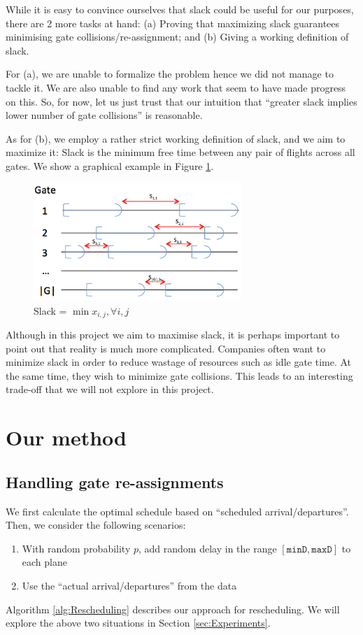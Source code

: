 \documentclass[12pt, a4paper]{report}
\begin{document}
While it is easy to convince ourselves that slack could be useful for our purposes, there are 2 more tasks at hand: (a) Proving that maximizing slack guarantees minimising gate collisions/re-assignment; and (b) Giving a working definition of slack.

For (a), we are unable to formalize the problem hence we did not manage to tackle it. We are also unable to find any work that seem to have made progress on this. So, for now, let us just trust that our intuition that ``greater slack implies lower number of gate collisions'' is reasonable.

As for (b), we employ a rather strict working definition of slack, and we aim to maximize it: Slack is the minimum free time between any pair of flights across all gates. We show a graphical example in Figure \ref{fig:Slack definition}.

\begin{figure}[h!]
\centering
\includegraphics[width=0.7\textwidth]{../figures/slack.png}
\caption{Slack = $\min x_{i,j}, \forall i,j$}
\label{fig:Slack definition}
\end{figure}

Although in this project we aim to maximise slack, it is perhaps important to point out that reality is much more complicated. Companies often want to minimize slack in order to reduce wastage of resources such as idle gate time. At the same time, they wish to minimize gate collisions. This leads to an interesting trade-off that we will not explore in this project.

\newpage
\section{Our method}
\subsection{Handling gate re-assignments}
We first calculate the optimal schedule based on ``scheduled arrival/departures''. Then, we consider the following scenarios:
\begin{enumerate}
\item With random probability $p$, add random delay in the range $[\texttt{minD}, \texttt{maxD}]$ to each plane
\item Use the ``actual arrival/departures'' from the data
\end{enumerate}
Algorithm \ref{alg:Rescheduling} describes our approach for rescheduling. We will explore the above two situations in Section \ref{sec:Experiments}.
\end{document}
